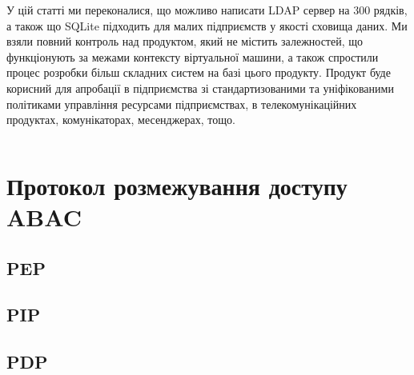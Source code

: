 У цій статті ми переконалися, що можливо написати LDAP сервер на 300 рядків, а також що SQLite підходить для малих підприємств у якості сховища даних. Ми взяли повний контроль над продуктом, який не містить залежностей, що функціонують за межами контексту віртуальної машини, а також спростили процес розробки більш складних систем на базі цього продукту. Продукт буде корисний для апробації в підприємства зі стандартизованими та уніфікованими політиками управління ресурсами підприємствах, в телекомунікаційних продуктах, комунікаторах, месенджерах, тощо.

\begin{lstlisting}
\end{lstlisting}

\section{Протокол розмежування доступу ABAC}

\subsection{PEP}
\subsection{PIP}
\subsection{PDP}
